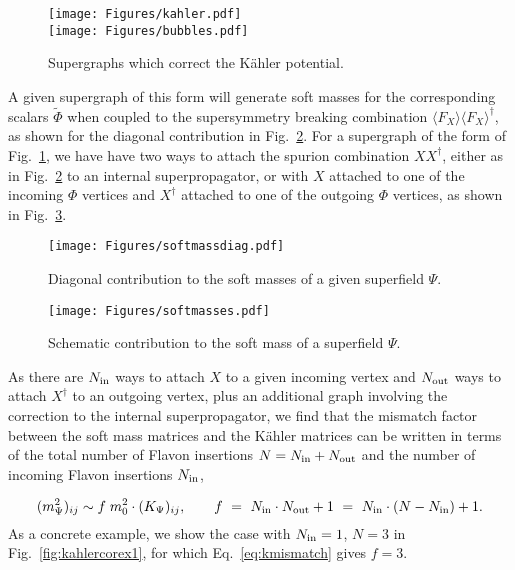 \documentclass[a4paper,11pt]{article}
\begin{document}
\begin{figure} 
\center
\texttt{[image: Figures/kahler.pdf]} \\
\texttt{[image: Figures/bubbles.pdf]}  %
\caption{Supergraphs which correct the K\"ahler potential.}
\label{fig:kahler}
\end{figure}

A given supergraph of this form will generate soft masses for the corresponding scalars $\tilde \Phi$ when coupled to the supersymmetry breaking combination $\langle F_X \rangle \langle F_X \rangle^{\dagger}$, as shown for the diagonal contribution in Fig.~\ref{fig:softmassdiag}. For a supergraph of the form of Fig.~\ref{fig:kahler}, we have have two ways to attach the spurion combination $X X^{\dagger}$, either as in Fig.~\ref{fig:softmassdiag} to an internal superpropagator, or with $X$ attached to one of the incoming $\Phi$ vertices and $X^{\dagger}$ attached to one of the outgoing $\Phi$ vertices, as shown in Fig.~\ref{fig:softmasses}.

\begin{figure} 
\center
\texttt{[image: Figures/softmassdiag.pdf]}        
\caption{Diagonal contribution to the soft masses of a given superfield $\Psi$.}
\label{fig:softmassdiag}
\end{figure}
\begin{figure} 
\center
\texttt{[image: Figures/softmasses.pdf]}        
\caption{Schematic contribution to the soft mass of a superfield $\Psi$.}
\label{fig:softmasses}
\end{figure}

As there are $N_{\rm in}$ ways to attach $X$ to a given incoming vertex and $N_{\rm out}$ ways to attach $X^{\dagger}$ to an outgoing vertex, plus an additional graph involving the correction to the internal superpropagator, we find that the mismatch factor between the soft mass matrices and the K\"ahler matrices can be written in terms of the total number of Flavon insertions $N= N_{\rm in}+N_{\rm out}$ and the number of incoming Flavon insertions $N_{\rm in}$,

\begin{equation} \label{eq:kmismatch}
(m^2_{\Psi})_{ij} \sim f\; m_0^2 \cdot (K_\Psi)_{ij}, \qquad f ~=~ N_{\rm in} \cdot N_{\rm out}+1 ~=~ N_{\rm in} \cdot (N - N_{\rm in}) +1 .
\end{equation}
As a concrete example, we show the case with $N_{\rm in}=1$, $N=3$ in Fig.~\ref{fig:kahlercorex1}, for which Eq.~\ref{eq:kmismatch} gives $f=3$. 
\end{document}
